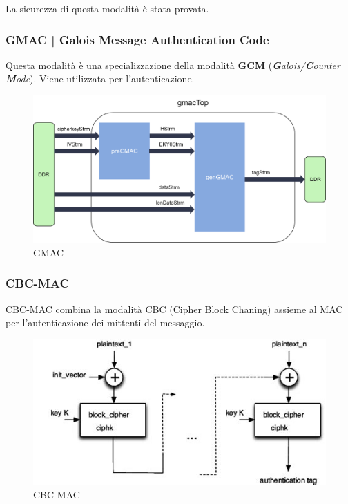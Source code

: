 \textsf{\small La sicurezza di questa modalità è stata provata.}

\subsubsection{GMAC | Galois Message Authentication Code}

 

\textsf{\small Questa modalità è una specializzazione della modalità \textbf{GCM} (\emph{\textbf{G}alois/\textbf{C}ounter \textbf{M}ode}). Viene utilizzata per l'autenticazione.}

\begin{figure}[H]
	\centering
	\includegraphics[width=.9\textwidth, height=.9\textheight, keepaspectratio]{./images/aes_modes/internal_structure_of_gmac} %
	\caption{GMAC}
	\label{fig:gmac}
\end{figure}

\subsubsection{CBC-MAC}

  

\textsf{\small CBC-MAC combina la modalità CBC (Cipher Block Chaning) assieme al MAC per l'autenticazione dei mittenti del messaggio.}

\begin{figure}[H]
	\centering
	\includegraphics[width=.9\textwidth, height=.9\textheight, keepaspectratio]{./images/aes_modes/cbc-mac}
	\caption{CBC-MAC}
	\label{fig:cbc-mac}
\end{figure}

